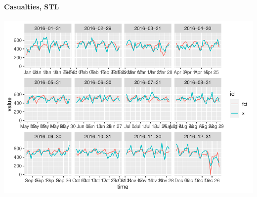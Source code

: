 \hypertarget{casualties-stl-1}{%
\paragraph{Casualties, STL}\label{casualties-stl-1}}

\begin{Schunk}

\includegraphics[width=1\linewidth]{overview_files/figure-latex/unnamed-chunk-10-1} \end{Schunk}



\address{%
Christoph Sax\\
University of Base\\%
line 1\\ line 2\\
%
\url{https://journal.r-project.org}%
\\\textit{ORCiD: \href{https://orcid.org/0000-0002-9079-593X}{0000-0002-9079-593X}}%
\\\href{mailto:author1@work}{\nolinkurl{author1@work}}
}

\address{%
Author Two\\
Affiliation 1\\%
line 1 affiliation 1\\ line 2 affiliation 1\\
Affiliation 2\\%
line 1 affiliation 2\\ line 2 affiliation 2\\
%
\url{https://journal.r-project.org}%
\\\textit{ORCiD: \href{https://orcid.org/0000-0002-9079-593X}{0000-0002-9079-593X}}%
\\\href{mailto:author2@work}{\nolinkurl{author2@work}}
}

\address{%
Author Three\\
Affiliation\\%
line 1 affiliation\\ line 2 affiliation\\
%
\url{https://journal.r-project.org}%
%
\\\href{mailto:author3@work}{\nolinkurl{author3@work}}
}

